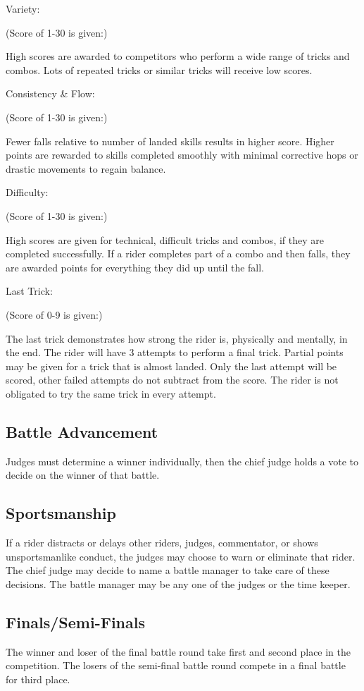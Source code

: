 Variety:

(Score of 1-30 is given:)

High scores are awarded to competitors who perform a wide range of tricks and combos.
Lots of repeated tricks or similar tricks will receive low scores.

Consistency \& Flow:

(Score of 1-30 is given:)

Fewer falls relative to number of landed skills results in higher score.
Higher points are rewarded to skills completed smoothly with minimal corrective hops or drastic movements to regain balance.

Difficulty:

(Score of 1-30 is given:)

High scores are given for technical, difficult tricks and combos, if they are completed successfully.
If a rider completes part of a combo and then falls, they are awarded points for everything they did up until the fall. 

Last Trick:

(Score of 0-9 is given:)

The last trick demonstrates how strong the rider is, physically and mentally, in the end.
The rider will have 3 attempts to perform a final trick.
Partial points may be given for a trick that is almost landed.
Only the last attempt will be scored, other failed attempts do not subtract from the score.
The rider is not obligated to try the same trick in every attempt.

\subsection{Battle Advancement \label{subsec:flat-street_flatland-judging-scoring_battle}}
Judges must determine a winner individually, then the chief judge holds a vote to decide on the winner of that battle.

\subsection{Sportsmanship}
If a rider distracts or delays other riders, judges, commentator, or shows unsportsmanlike conduct, the judges may choose to warn or eliminate that rider.
The chief judge may decide to name a battle manager to take care of these decisions.
The battle manager may be any one of the judges or the time keeper.

\subsection{Finals/Semi-Finals}
The winner and loser of the final battle round take first and second place in the competition. The losers of the semi-final battle round compete in a final battle for third place.

